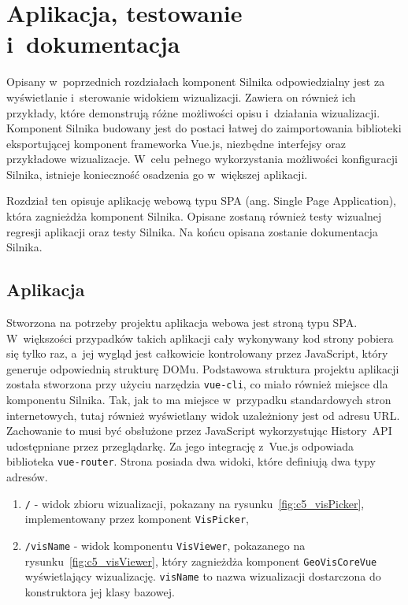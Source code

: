 \chapter{Aplikacja, testowanie i~dokumentacja}

Opisany w~poprzednich rozdziałach komponent Silnika odpowiedzialny jest za wyświetlanie i~sterowanie widokiem wizualizacji. Zawiera on również ich przykłady, które demonstrują różne możliwości opisu i~działania wizualizacji. Komponent Silnika budowany jest do postaci łatwej do zaimportowania biblioteki eksportującej komponent frameworka Vue.js, niezbędne interfejsy oraz przykładowe wizualizacje. W~celu pełnego wykorzystania możliwości konfiguracji Silnika, istnieje konieczność osadzenia go w~większej aplikacji.

Rozdział ten opisuje aplikację webową typu SPA (ang. Single Page Application), która zagnieżdża komponent Silnika. Opisane zostaną również testy wizualnej regresji aplikacji oraz testy Silnika. Na końcu opisana zostanie dokumentacja Silnika.

\section{Aplikacja}
Stworzona na potrzeby projektu aplikacja webowa jest stroną typu SPA. W~większości przypadków takich aplikacji cały wykonywany kod strony pobiera się tylko raz, a~jej wygląd jest całkowicie kontrolowany przez JavaScript, który generuje odpowiednią strukturę DOMu. Podstawowa struktura projektu aplikacji została stworzona przy użyciu narzędzia \texttt{vue-cli}, co miało również miejsce dla komponentu Silnika. Tak, jak to ma miejsce w~przypadku standardowych stron internetowych, tutaj również wyświetlany widok uzależniony jest od adresu URL. Zachowanie to musi być obsłużone przez JavaScript wykorzystując History~API~\cite{HistoryAPI} udostępniane przez przeglądarkę. Za jego integrację z~Vue.js odpowiada biblioteka \texttt{vue-router}. Strona posiada dwa widoki, które definiują dwa typy adresów.

\begin{enumerate}
    \item \texttt{/} - widok zbioru wizualizacji, pokazany na rysunku~\ref{fig:c5_visPicker}, implementowany przez komponent \texttt{VisPicker},
    \item \texttt{/visName} - widok komponentu \texttt{VisViewer}, pokazanego na rysunku~\ref{fig:c5_visViewer}, który zagnieżdża komponent \texttt{GeoVisCoreVue} wyświetlający wizualizację. \texttt{visName} to nazwa wizualizacji dostarczona do konstruktora jej klasy bazowej.
\end{enumerate}

